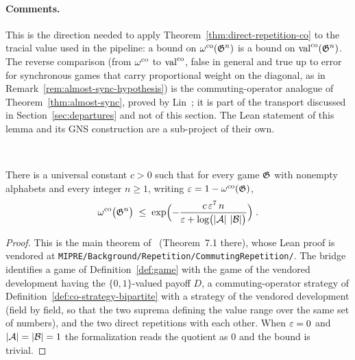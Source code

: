 \paragraph{Comments.} This is the direction needed to apply
Theorem~\ref{thm:direct-repetition-co} to the tracial value used in the pipeline: a
bound on $\omega^{\mathrm{co}}(\mathfrak{G}^n)$ is a bound on $\mathrm{val}^{\mathrm{co}}(\mathfrak{G}^n)$. The reverse comparison
(from $\omega^{\mathrm{co}}$ to $\mathrm{val}^{\mathrm{co}}$, false in general and true up to error for synchronous games
that carry proportional weight on the diagonal, as in
Remark~\ref{rem:almost-sync-hypothesis}) is the commuting-operator analogue of
Theorem~\ref{thm:almost-sync}, proved by Lin~\cite{Lin23}; it is part of the transport
discussed in Section~\ref{sec:departures} and not of this section. The Lean statement
of this lemma and its GNS construction are a sub-project of their own.

\effortHard\ \qlib

\begin{theorem}
\label{thm:direct-repetition-co}
\leanok
\qlib{}
There is a universal constant $c > 0$ such that for every game $\mathfrak{G}$ with nonempty
alphabets and every integer $n \geq 1$, writing $\varepsilon = 1 - \omega^{\mathrm{co}}(\mathfrak{G})$,
\begin{equation*}
  \omega^{\mathrm{co}}\bigl( \mathfrak{G}^{n} \bigr) \;\leq\;
  \exp\Bigl( - \frac{c\, \varepsilon^{7}\, n}{\varepsilon + \log\bigl(\left\vert {\ensuremath{\mathcal{A}}} \right\vert\,\left\vert {\ensuremath{\mathcal{B}}} \right\vert\bigr)} \Bigr)\;.
\end{equation*}
\end{theorem}
\begin{proof}
\leanok
This is the main theorem of~\cite{Vid26} (Theorem~7.1 there), whose Lean proof is
vendored at \texttt{MIPRE/Background/Repetition/CommutingRepetition/}. The bridge
identifies a game of Definition~\ref{def:game} with the game of the vendored
development having the $\{0, 1\}$-valued payoff $D$, a commuting-operator strategy of
Definition~\ref{def:co-strategy-bipartite} with a strategy of the vendored development
(field by field, so that the two suprema defining the value range over the same set of
numbers), and the two direct repetitions with each other. When $\varepsilon = 0$ and $\left\vert {\ensuremath{\mathcal{A}}} \right\vert
= \left\vert {\ensuremath{\mathcal{B}}} \right\vert = 1$ the formalization reads the quotient as $0$ and the bound is trivial.
\end{proof}

